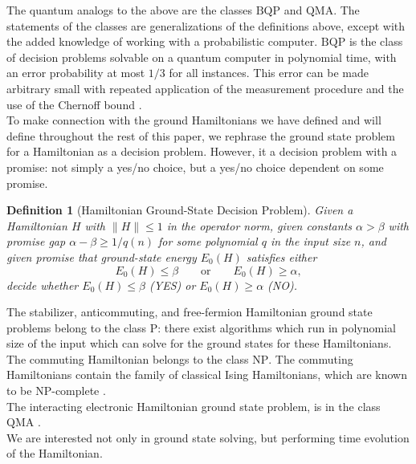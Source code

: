 \documentclass[%
 aip,
 amsmath,amssymb,
 reprint,%
]{revtex4-1}
\newtheorem{identity}{{Definition}}
\begin{document}
\indent The quantum analogs to the above are the classes $\mathrm{BQP}$ and $\mathrm{QMA}$. The statements of the classes are generalizations of the definitions above, except with the added knowledge of working with a probabilistic computer. $\mathrm{BQP}$ is the class of decision problems solvable on a quantum computer in polynomial time, with an error probability at most $1/3$ for all instances. This error can be made arbitrary small with repeated application of the measurement procedure and the use of the Chernoff bound . \\
\indent To make connection with the ground Hamiltonians we have defined and will define throughout the rest of this paper, we rephrase the ground state problem for a Hamiltonian as a decision problem. However, it a decision problem with a promise: not simply a yes/no choice, but a yes/no choice dependent on some promise. 
\begin{identity}[Hamiltonian Ground-State Decision Problem]
    Given a Hamiltonian $H$ with $\| H\|\leq 1$ in the operator norm, given constants $\alpha > \beta$ with
    { \it promise gap}  $\alpha - \beta \geq 1/q(n)$ for some polynomial $q$
    in the input size $n$, and given promise that ground-state energy
    $E_0(H)$ satisfies either
    \[
        E_0(H) \leq \beta
        \qquad\text{or}\qquad
        E_0(H) \geq \alpha,
    \]
    decide whether $E_0(H) \leq \beta$ (YES) or
    $E_0(H) \geq \alpha$ (NO).
\end{identity}
The stabilizer, anticommuting, and free-fermion Hamiltonian ground state problems belong to the class $\mathrm{P}$: there exist algorithms which run in polynomial size of the input which can solve for the ground states for these Hamiltonians. The commuting Hamiltonian belongs to the class $\mathrm{NP}$. The commuting Hamiltonians contain the family of classical Ising Hamiltonians, which are known to be $\mathrm{NP}$-complete . \\
\indent The interacting electronic Hamiltonian ground state problem, is in the class $\mathrm{QMA}$ . \\
\indent We are interested not only in ground state solving, but performing time evolution of the Hamiltonian. %
\end{document}
